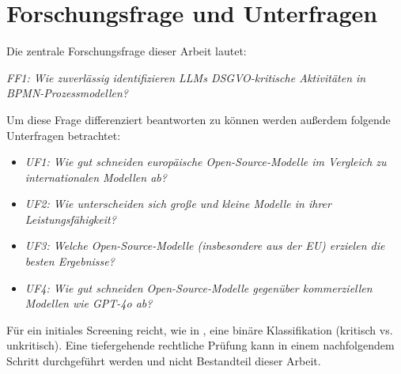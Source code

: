 \section{Forschungsfrage und Unterfragen}\label{sec:forschungsfrage-und-unterfragen}

Die zentrale Forschungsfrage dieser Arbeit lautet:

\emph{FF1: Wie zuverlässig identifizieren \acp{LLM} \ac{DSGVO}-kritische Aktivitäten in \ac{BPMN}-Prozessmodellen?}

Um diese Frage differenziert beantworten zu können werden außerdem folgende Unterfragen betrachtet:

\begin{itemize}
    \item \emph{UF1: Wie gut schneiden europäische Open-Source-Modelle im Vergleich zu internationalen Modellen ab?}
    \item \emph{UF2: Wie unterscheiden sich große und kleine Modelle in ihrer Leistungsfähigkeit?}
    \item \emph{UF3: Welche Open-Source-Modelle (insbesondere aus der EU) erzielen die besten Ergebnisse?}
    \item \emph{UF4: Wie gut schneiden Open-Source-Modelle gegenüber kommerziellen Modellen wie GPT-4o ab?}
\end{itemize}

Für ein initiales Screening reicht, wie in \cite{nake2023towards}, eine binäre Klassifikation (kritisch vs. unkritisch). Eine tiefergehende rechtliche Prüfung kann in einem nachfolgendem Schritt durchgeführt werden und nicht Bestandteil dieser Arbeit.